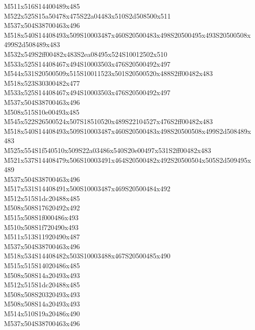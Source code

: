 \documentclass{article}
\begin{document}
\begin{multicols}{5}
\begin{center}
M511x516S14400489x485 %
\\M522x525S15a50478x475S22a04483x510S2d508500x511 %
\\M537x504S38700463x496 %
\\M518x540S14408493x509S10003487x460S20500483x498S20500495x493S20500508x499S2d508489x483 %
\\M532x549S2ff00482x483S2ea08495x524S10012502x510 %
\\M533x525S14408467x494S10003503x476S20500492x497 %
\\M544x531S20500509x515S10011523x501S20500520x488S2ff00482x483 %
\\M518x523S30300482x477 %
\\M533x525S14408467x494S10003503x476S20500492x497 %
\\M537x504S38700463x496 %
\\M508x515S10e00493x485 %
\\M545x522S26500524x507S18510520x489S22104527x476S2ff00482x483 %
\\M518x540S14408493x509S10003487x460S20500483x498S20500508x499S2d508489x483 %
\\M525x554S1f540510x509S22a03486x540S20e00497x531S2ff00482x483 %
\\M521x537S14408479x506S10003491x464S20500482x492S20500504x505S2d509495x489 %
\\M537x504S38700463x496 %
\\M517x531S14408491x500S10003487x469S20500484x492 %
\\M512x515S1dc20488x485 %
\\M508x508S17620492x492 %
\\M515x508S1f000486x493 %
\\M510x508S1f720490x493 %
\\M511x513S11920490x487 %
\\M537x504S38700463x496 %
\\M518x534S14408482x503S10003488x467S20500485x490 %
\\M515x515S14020486x485 %
\\M508x508S14a20493x493 %
\\M512x515S1dc20488x485 %
\\M508x508S20320493x493 %
\\M508x508S14a20493x493 %
\\M514x510S19a20486x490 %
\\M537x504S38700463x496 %

\end{center}
\end{multicols}
\end{document}
